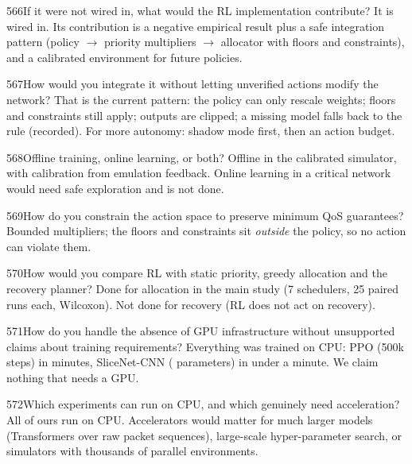 \begin{qa}{566}{If it were not wired in, what would the RL implementation contribute?}
It is wired in. Its contribution is a negative empirical result plus a safe integration pattern (policy $\rightarrow$
priority multipliers $\rightarrow$ allocator with floors and constraints), and a calibrated environment for future
policies.
\end{qa}

\begin{qa}{567}{How would you integrate it without letting unverified actions modify the network?}
That is the current pattern: the policy can only rescale weights; floors and constraints still apply; outputs are
clipped; a missing model falls back to the rule (recorded). For more autonomy: shadow mode first, then an action
budget.
\end{qa}

\begin{qa}{568}{Offline training, online learning, or both?}
Offline in the calibrated simulator, with calibration from emulation feedback. Online learning in a critical network
would need safe exploration and is not done.
\end{qa}

\begin{qa}{569}{How do you constrain the action space to preserve minimum QoS guarantees?}
Bounded multipliers; the floors and constraints sit \emph{outside} the policy, so no action can violate them.
\end{qa}

\begin{qa}{570}{How would you compare RL with static priority, greedy allocation and the recovery planner?}
Done for allocation in the main study (7 schedulers, 25 paired runs each, Wilcoxon). Not done for recovery (RL does
not act on recovery).
\end{qa}

\begin{qa}{571}{How do you handle the absence of GPU infrastructure without unsupported claims about training requirements?}
Everything was trained on CPU: PPO (500k steps) in minutes, SliceNet-CNN (\NCnnParams{} parameters) in under a minute.
We claim nothing that needs a GPU.
\end{qa}

\begin{qa}{572}{Which experiments can run on CPU, and which genuinely need acceleration?}
All of ours run on CPU. Accelerators would matter for much larger models (Transformers over raw packet sequences),
large-scale hyper-parameter search, or simulators with thousands of parallel environments.
\end{qa}

